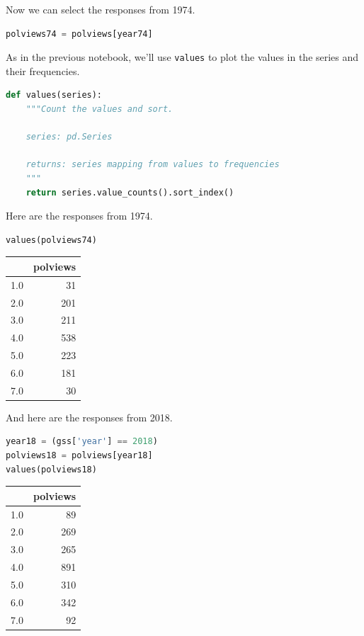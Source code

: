 Now we can select the responses from 1974.

\begin{lstlisting}[language=Python]
polviews74 = polviews[year74]
\end{lstlisting}

As in the previous notebook, we'll use \passthrough{\lstinline!values!}
to plot the values in the series and their frequencies.

\begin{lstlisting}[language=Python]
def values(series):
    """Count the values and sort.
    
    series: pd.Series
    
    returns: series mapping from values to frequencies
    """
    return series.value_counts().sort_index()
\end{lstlisting}

Here are the responses from 1974.

\begin{lstlisting}[language=Python]
values(polviews74)
\end{lstlisting}

\begin{tabular}{lr}
\toprule
{} &  polviews \\
\midrule
1.0 &        31 \\
2.0 &       201 \\
3.0 &       211 \\
4.0 &       538 \\
5.0 &       223 \\
6.0 &       181 \\
7.0 &        30 \\
\bottomrule
\end{tabular}

And here are the responses from 2018.

\begin{lstlisting}[language=Python]
year18 = (gss['year'] == 2018)
polviews18 = polviews[year18]
values(polviews18)
\end{lstlisting}

\begin{tabular}{lr}
\toprule
{} &  polviews \\
\midrule
1.0 &        89 \\
2.0 &       269 \\
3.0 &       265 \\
4.0 &       891 \\
5.0 &       310 \\
6.0 &       342 \\
7.0 &        92 \\
\bottomrule
\end{tabular}

